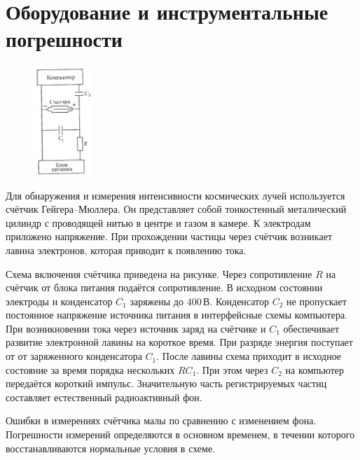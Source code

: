 \section{Оборудование и инструментальные погрешности}

\begin{figure}
    \centering
    \includegraphics[width=0.2\textwidth]{img/counter.png}
\end{figure}

Для обнаружения и измерения интенсивности космических лучей используется
счётчик Гейгера--Мюллера. Он представляет собой тонкостенный металический цилиндр
с проводящей нитью в центре и газом в камере. К электродам приложено напряжение.
При прохождении частицы через счётчик возникает лавина электронов, которая
приводит к появлению тока.

Схема включения счётчика приведена на рисунке. Через сопротивление $R$
на счётчик от блока питания подаётся сопротивление. В исходном состоянии
электроды и конденсатор $C_1$ заряжены до $400\,\text{В}$. Конденсатор
$C_2$ не пропускает постоянное напряжение источника питания в интерфейсные
схемы компьютера. При возникновении тока через источник заряд на счётчике и $C_1$
обеспечивает развитие электронной лавины на короткое время. При разряде энергия
поступает от от заряженного конденсатора $C_1$. После лавины схема приходит
в исходное состояние за время порядка нескольких $RC_1$. При этом через $C_2$
на компьютер передаётся короткий импульс. Значительную часть регистрируемых частиц
составляет естественный радиоактивный фон.

Ошибки в измерениях счётчика малы по сравнению с изменением фона. Погрешности
измерений определяются в основном временем, в течении которого восстанавливаются нормальные
условия в схеме. 
